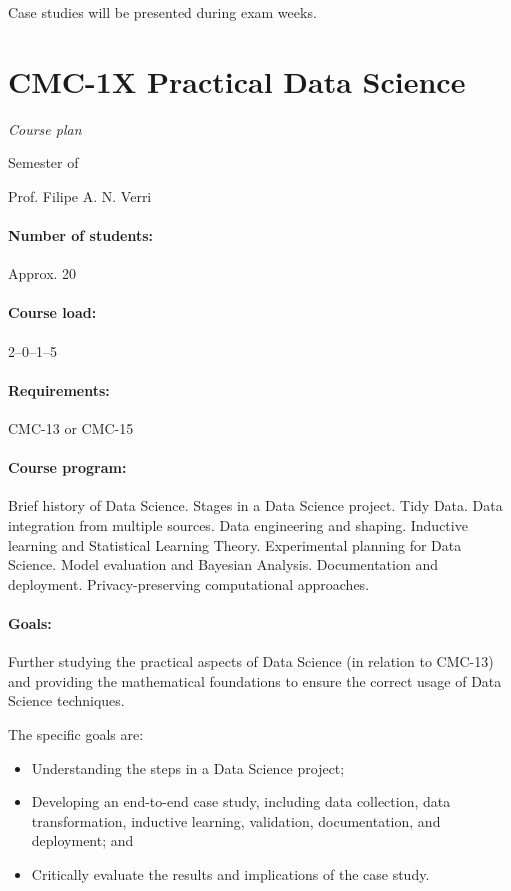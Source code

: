 Case studies will be presented during exam weeks.

\newpage
{}
\thispagestyle{empty}
\section*{CMC-1X Practical Data Science}

\emph{Course plan}

 Semester of \the\year{}

Prof. Filipe A. N. Verri

\paragraph{Number of students:} Approx. 20

\paragraph{Course load:} 2--0--1--5

\paragraph{Requirements:} CMC-13 or CMC-15

\paragraph{Course program:}
Brief history of Data Science. Stages in a Data Science project. Tidy Data. Data
integration from multiple sources. Data engineering and shaping. Inductive learning and
Statistical Learning Theory. Experimental planning for Data Science. Model evaluation and
Bayesian Analysis. Documentation and deployment. Privacy-preserving computational
approaches.

\paragraph{Goals:}
Further studying the practical aspects of Data Science (in relation to CMC-13) and providing
the mathematical foundations to ensure the correct usage of Data Science techniques.

The specific goals are:
\begin{itemize}
  \item Understanding the steps in a Data Science project;
  \item Developing an end-to-end case study, including data collection, data transformation,
    inductive learning, validation, documentation, and deployment; and
  \item Critically evaluate the results and implications of the case study.
\end{itemize}


